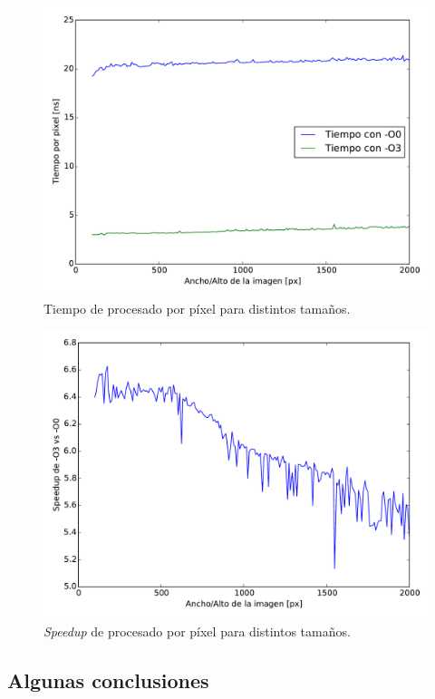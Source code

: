\begin{figure}
  \centering
  \includegraphics[width=0.7\columnwidth]{tiempo_optimiz_diff.pdf}
  \caption{Tiempo de procesado por píxel para distintos tamaños.}
  \label{fig:tiempo_optimiz_diff}
\end{figure}

\begin{figure}
  \centering
  \includegraphics[width=0.7\columnwidth]{speedup_optimiz_diff.pdf}
  \caption{\emph{Speedup} de procesado por píxel para distintos tamaños.}
  \label{fig:speedup_optimiz_diff}
\end{figure}


  
\subsection{Algunas conclusiones}

